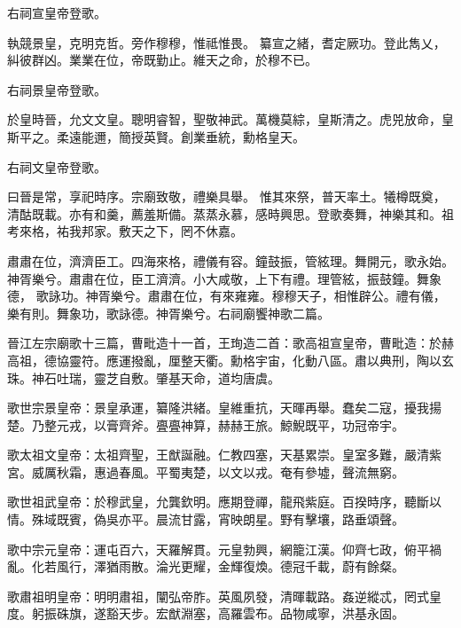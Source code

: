 \begin{pinyinscope}
 右祠宣皇帝登歌。



 執競景皇，克明克哲。旁作穆穆，惟祗惟畏。
 纂宣之緒，耆定厥功。登此雋乂，糾彼群凶。業業在位，帝既勤止。維天之命，於穆不已。



 右祠景皇帝登歌。



 於皇時晉，允文文皇。聰明睿智，聖敬神武。萬機莫綜，皇斯清之。虎兕放命，皇斯平之。柔遠能邇，簡授英賢。創業垂統，勳格皇天。



 右祠文皇帝登歌。



 曰晉是常，享祀時序。宗廟致敬，禮樂具舉。
 惟其來祭，普天率土。犧樽既奠，清酤既載。亦有和羹，薦羞斯備。蒸蒸永慕，感時興思。登歌奏舞，神樂其和。祖考來格，祐我邦家。敷天之下，罔不休嘉。



 肅肅在位，濟濟臣工。四海來格，禮儀有容。鐘鼓振，管絃理。舞開元，歌永始。神胥樂兮。肅肅在位，臣工濟濟。小大咸敬，上下有禮。理管絃，振鼓鐘。舞象德，
 歌詠功。神胥樂兮。肅肅在位，有來雍雍。穆穆天子，相惟辟公。禮有儀，樂有則。舞象功，歌詠德。神胥樂兮。右祠廟饗神歌二篇。



 晉江左宗廟歌十三篇，曹毗造十一首，王珣造二首：歌高祖宣皇帝，曹毗造：於赫高祖，德協靈符。應運撥亂，厘整天衢。勳格宇宙，化動八區。肅以典刑，陶以玄珠。神石吐瑞，靈芝自敷。肇基天命，道均唐虞。



 歌世宗景皇帝：景皇承運，纂隆洪緒。皇維重抗，天暉再舉。蠢矣二寇，擾我揚楚。乃整元戎，以膏齊斧。亹亹神算，赫赫王旅。鯨鯢既平，功冠帝宇。



 歌太祖文皇帝：太祖齊聖，王猷誕融。仁教四塞，天基累崇。皇室多難，嚴清紫宮。威厲秋霜，惠過春風。平蜀夷楚，以文以戎。奄有參墟，聲流無窮。



 歌世祖武皇帝：於穆武皇，允龔欽明。應期登禪，龍飛紫庭。百揆時序，聽斷以情。殊域既賓，偽吳亦平。晨流甘露，宵映朗星。野有擊壤，路垂頌聲。



 歌中宗元皇帝：運屯百六，天羅解貫。元皇勃興，網籠江漢。仰齊七政，俯平禍亂。化若風行，澤猶雨散。淪光更耀，金輝復煥。德冠千載，蔚有餘粲。



 歌肅祖明皇帝：明明肅祖，闡弘帝胙。英風夙發，清暉載路。姦逆縱忒，罔式皇度。躬振硃旗，遂豁天步。宏猷淵塞，高羅雲布。品物咸寧，洪基永固。




\end{pinyinscope}
